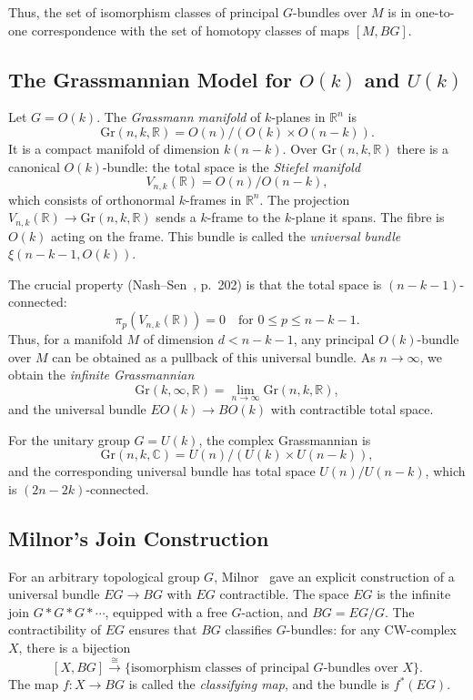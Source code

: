 \documentclass[11pt]{article}
\newcommand{\C}{\mathbb{C}}
\newcommand{\R}{\mathbb{R}}
\newcommand{\Gr}{\mathrm{Gr}}
\begin{document}
Thus, the set of isomorphism classes of principal \(G\)-bundles over \(M\) is in one-to-one correspondence with the set of homotopy classes of maps \([M, BG]\).
\subsection{The Grassmannian Model for \(O(k)\) and \(U(k)\)}
Let \(G=O(k)\). The \emph{Grassmann manifold} of \(k\)-planes in \(\R^n\) is
\[
\Gr(n,k,\R) = O(n)/(O(k)\times O(n-k)).
\]
It is a compact manifold of dimension \(k(n-k)\). Over \(\Gr(n,k,\R)\) there is a canonical \(O(k)\)-bundle: the total space is the \emph{Stiefel manifold}
\[
V_{n,k}(\R) = O(n)/O(n-k),
\]
which consists of orthonormal \(k\)-frames in \(\R^n\). The projection \(V_{n,k}(\R)\to\Gr(n,k,\R)\) sends a \(k\)-frame to the \(k\)-plane it spans. The fibre is \(O(k)\) acting on the frame. This bundle is called the \emph{universal bundle} \(\xi(n-k-1, O(k))\).

The crucial property (Nash--Sen~\cite{NashSen}, p.~202) is that the total space is \((n-k-1)\)-connected:
\[
\pi_p(V_{n,k}(\R)) = 0 \quad \text{for } 0\le p\le n-k-1.
\]
Thus, for a manifold \(M\) of dimension \(d < n-k-1\), any principal \(O(k)\)-bundle over \(M\) can be obtained as a pullback of this universal bundle. As \(n\to\infty\), we obtain the \emph{infinite Grassmannian}
\[
\Gr(k,\infty,\R) = \lim_{n\to\infty} \Gr(n,k,\R),
\]
and the universal bundle \(EO(k)\to BO(k)\) with contractible total space.

For the unitary group \(G=U(k)\), the complex Grassmannian is
\[
\Gr(n,k,\C) = U(n)/(U(k)\times U(n-k)),
\]
and the corresponding universal bundle has total space \(U(n)/U(n-k)\), which is \((2n-2k)\)-connected.

\subsection{Milnor's Join Construction}
For an arbitrary topological group \(G\), Milnor~\cite{Milnor} gave an explicit construction of a universal bundle \(EG\to BG\) with \(EG\) contractible. The space \(EG\) is the infinite join \(G*G*G*\cdots\), equipped with a free \(G\)-action, and \(BG = EG/G\). The contractibility of \(EG\) ensures that \(BG\) classifies \(G\)-bundles: for any CW-complex \(X\), there is a bijection
\[
[X, BG] \xrightarrow{\cong} \{\text{isomorphism classes of principal } G\text{-bundles over } X\}.
\]
The map \(f:X\to BG\) is called the \emph{classifying map}, and the bundle is \(f^*(EG)\).
\end{document}
